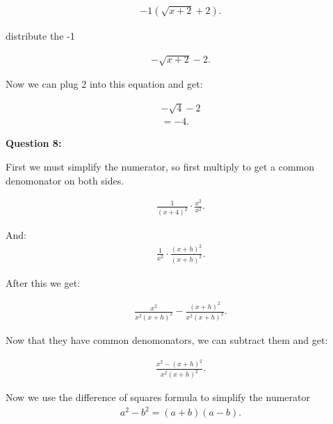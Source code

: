 \documentclass{report}
\begin{document}
    \begin{align*}
        -1 \left(\sqrt{x+2}+2\right)
    .\end{align*}

    \bigbreak \noindent 
    distribute the -1

    \begin{align*}
        -\sqrt{x+2} -2
    .\end{align*}

    \bigbreak \noindent 
    Now we can plug 2 into this equation and get:

    \begin{align*}
        -\sqrt{4} -2 \\ 
        = -4
    .\end{align*}

    \pagebreak
    \begin{Large}
       \noindent \textbf{Question 8:} 
    \end{Large}

    \bigbreak \noindent 
    First we must simplify the numerator, so first multiply to get a common denomonator on both 
    sides.

    \begin{align*}
        \frac{1}{ \left(x+4\right)^2} \cdot \frac{x^2}{x^2}
    .\end{align*}

    \bigbreak \noindent 
    And:
    \begin{align*}
        \frac{1}{x^2} \cdot \frac{ \left(x+h\right)^2}{ \left(x+h\right)^2}
    .\end{align*}

    \bigbreak \noindent 
    After this we get:

    \begin{align*}
        \frac{x^2}{x^2 \left(x+h\right)^2} - \frac{ \left(x+h\right)^2}{x^2 \left(x+h\right)^2}
    .\end{align*}

    \bigbreak \noindent 
    Now that they have common denomonators, we can subtract them and get:

    \begin{align*}
        \frac{x^2 - \left(x+h\right)^2}{x^2 \left(x+h\right)^2}
    .\end{align*}

    \bigbreak \noindent 
    Now we use the difference of squares formula to simplify the numerator
    \begin{align*}
        a^2-b^2 = \left(a+b\right) \left(a-b\right)
    .\end{align*}
\end{document}
